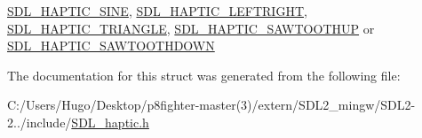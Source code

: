 \hyperlink{_s_d_l__haptic_8h_aa6d75adbfcdda5075078e7a2849da5c0}{S\+D\+L\+\_\+\+H\+A\+P\+T\+I\+C\+\_\+\+S\+I\+NE}, \hyperlink{_s_d_l__haptic_8h_ae047624d8458ff6400887c37a36f86d3}{S\+D\+L\+\_\+\+H\+A\+P\+T\+I\+C\+\_\+\+L\+E\+F\+T\+R\+I\+G\+HT}, \hyperlink{_s_d_l__haptic_8h_ae8123eaa51511507375ba6ef9220fa46}{S\+D\+L\+\_\+\+H\+A\+P\+T\+I\+C\+\_\+\+T\+R\+I\+A\+N\+G\+LE}, \hyperlink{_s_d_l__haptic_8h_ab8e3f40f3c2bcee8905d13b634363c3f}{S\+D\+L\+\_\+\+H\+A\+P\+T\+I\+C\+\_\+\+S\+A\+W\+T\+O\+O\+T\+H\+UP} or \hyperlink{_s_d_l__haptic_8h_afd64aa747034a7ccf4b55f6246525701}{S\+D\+L\+\_\+\+H\+A\+P\+T\+I\+C\+\_\+\+S\+A\+W\+T\+O\+O\+T\+H\+D\+O\+WN} 

The documentation for this struct was generated from the following file\+:\begin{DoxyCompactItemize}
\item 
C\+:/\+Users/\+Hugo/\+Desktop/p8fighter-\/master(3)/extern/\+S\+D\+L2\+\_\+mingw/\+S\+D\+L2-\/2../include/\hyperlink{_s_d_l__haptic_8h}{S\+D\+L\+\_\+haptic.\+h}\end{DoxyCompactItemize}
